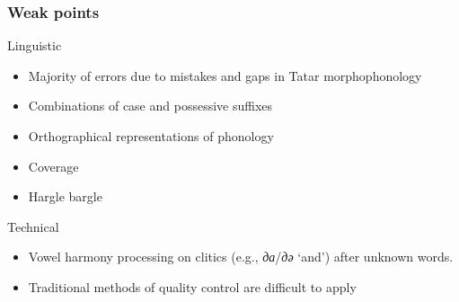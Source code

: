 \documentclass[10pt,xetex]{beamer} %
\begin{document}
\begin{frame}
  \frametitle{Weak points}

\begin{block}{Linguistic}
  
  \begin{itemize} %
    \item Majority of errors due to mistakes and gaps in Tatar morphophonology
    \item Combinations of case and possessive suffixes
    \item Orthographical representations of phonology
    \item Coverage
    \item Hargle bargle
  \end{itemize}
  
\end{block}

\begin{block}{Technical}
  \begin{itemize}
    \item Vowel harmony processing on clitics (e.g., \emph{да}/\emph{дә} `and')  
       after unknown words.
    \item Traditional methods of quality control are difficult to apply
  \end{itemize} 
\end{block}

\end{frame}
\end{document}
